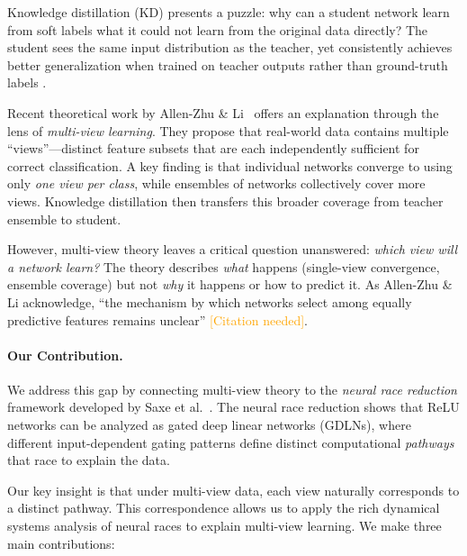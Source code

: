 \documentclass{article}
\newcommand{\citationneeded}{\textcolor{orange}{[Citation needed]}}
\begin{document}
Knowledge distillation (KD) presents a puzzle: why can a student network learn from soft labels what it could not learn from the original data directly? The student sees the same input distribution as the teacher, yet consistently achieves better generalization when trained on teacher outputs rather than ground-truth labels \cite{hinton2015distilling}.

Recent theoretical work by Allen-Zhu \& Li~\cite{allen2023towards} offers an explanation through the lens of \emph{multi-view learning}. They propose that real-world data contains multiple ``views''---distinct feature subsets that are each independently sufficient for correct classification. A key finding is that individual networks converge to using only \emph{one view per class}, while ensembles of networks collectively cover more views. Knowledge distillation then transfers this broader coverage from teacher ensemble to student.

However, multi-view theory leaves a critical question unanswered: \emph{which view will a network learn?} The theory describes \emph{what} happens (single-view convergence, ensemble coverage) but not \emph{why} it happens or how to predict it. As Allen-Zhu \& Li acknowledge, ``the mechanism by which networks select among equally predictive features remains unclear'' \citationneeded.

\paragraph{Our Contribution.} We address this gap by connecting multi-view theory to the \emph{neural race reduction} framework developed by Saxe et al.~\cite{saxe2022neural}. The neural race reduction shows that ReLU networks can be analyzed as gated deep linear networks (GDLNs), where different input-dependent gating patterns define distinct computational \emph{pathways} that race to explain the data.

Our key insight is that under multi-view data, each view naturally corresponds to a distinct pathway. This correspondence allows us to apply the rich dynamical systems analysis of neural races to explain multi-view learning. We make three main contributions:
\end{document}
